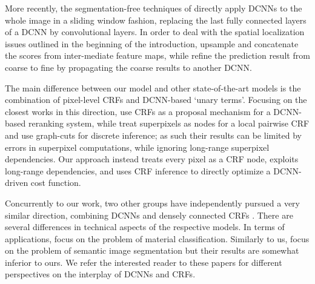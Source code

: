 
More recently, the segmentation-free techniques of \citep{long2014fully, eigen2014predicting} directly apply DCNNs to the whole image in a sliding window fashion, replacing the last fully connected layers of a DCNN  by convolutional layers. In order to deal with the spatial localization issues outlined in the beginning of the introduction, \citet{long2014fully} upsample and concatenate the scores from inter-mediate feature maps, while \citet{eigen2014predicting} refine the prediction result from coarse to fine by propagating the coarse results to another DCNN. 


The main difference between our model and other state-of-the-art models is the combination of pixel-level CRFs and DCNN-based `unary terms'. Focusing on the closest works in this direction, \citet{cogswell2014combining} use CRFs as a proposal mechanism for a DCNN-based reranking system, while \citet{farabet2013learning} treat superpixels as  nodes for a local pairwise CRF and use graph-cuts for discrete inference; as such their results can be limited by errors in superpixel computations, while ignoring  long-range superpixel dependencies. Our approach instead treats every pixel as a CRF node, exploits long-range dependencies, and uses  CRF inference to directly optimize a DCNN-driven cost function.

Concurrently to our work, two other groups have independently pursued
a very similar direction, combining DCNNs and densely connected CRFs
\citep{bell2014material, zheng2015crfrnn}. There are several
differences in technical aspects of the respective models. In terms of
applications, \citet{bell2014material} focus on the problem of material
classification. Similarly to us, \citet{zheng2015crfrnn} focus on the
problem of semantic image segmentation but their results are somewhat
inferior to ours. We refer the interested reader to these papers for
different perspectives on the interplay of DCNNs and CRFs.

